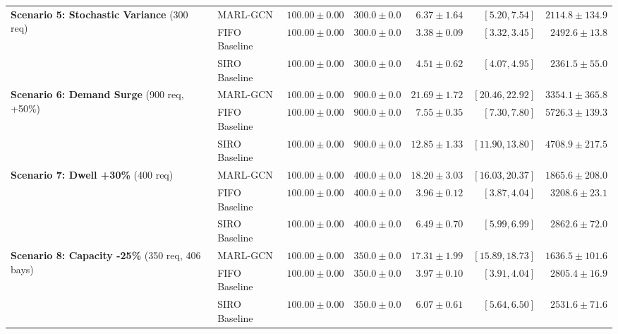 \documentclass[journal]{IEEEtran}
\begin{document}
\begin{table}[t]
\begin{tabular}{llrrrrr}
\midrule
\multirow{3}{*}{\textbf{Scenario 5: Stochastic Variance} (300 req)} 
& MARL-GCN & $100.00 \pm 0.00$ & $300.0 \pm 0.0$ & $6.37 \pm 1.64$ & $[5.20, 7.54]$ & $2114.8 \pm 134.9$ \\
& FIFO Baseline & $100.00 \pm 0.00$ & $300.0 \pm 0.0$ & $3.38 \pm 0.09$ & $[3.32, 3.45]$ & $2492.6 \pm 13.8$ \\
& SIRO Baseline & $100.00 \pm 0.00$ & $300.0 \pm 0.0$ & $4.51 \pm 0.62$ & $[4.07, 4.95]$ & $2361.5 \pm 55.0$ \\
\midrule
\multirow{3}{*}{\textbf{Scenario 6: Demand Surge} (900 req, +50\%)} 
& MARL-GCN & $100.00 \pm 0.00$ & $900.0 \pm 0.0$ & $21.69 \pm 1.72$ & $[20.46, 22.92]$ & $3354.1 \pm 365.8$ \\
& FIFO Baseline & $100.00 \pm 0.00$ & $900.0 \pm 0.0$ & $7.55 \pm 0.35$ & $[7.30, 7.80]$ & $5726.3 \pm 139.3$ \\
& SIRO Baseline & $100.00 \pm 0.00$ & $900.0 \pm 0.0$ & $12.85 \pm 1.33$ & $[11.90, 13.80]$ & $4708.9 \pm 217.5$ \\
\midrule
\multirow{3}{*}{\textbf{Scenario 7: Dwell +30\%} (400 req)} 
& MARL-GCN & $100.00 \pm 0.00$ & $400.0 \pm 0.0$ & $18.20 \pm 3.03$ & $[16.03, 20.37]$ & $1865.6 \pm 208.0$ \\
& FIFO Baseline & $100.00 \pm 0.00$ & $400.0 \pm 0.0$ & $3.96 \pm 0.12$ & $[3.87, 4.04]$ & $3208.6 \pm 23.1$ \\
& SIRO Baseline & $100.00 \pm 0.00$ & $400.0 \pm 0.0$ & $6.49 \pm 0.70$ & $[5.99, 6.99]$ & $2862.6 \pm 72.0$ \\
\midrule
\multirow{3}{*}{\textbf{Scenario 8: Capacity -25\%} (350 req, 406 bays)} 
& MARL-GCN & $100.00 \pm 0.00$ & $350.0 \pm 0.0$ & $17.31 \pm 1.99$ & $[15.89, 18.73]$ & $1636.5 \pm 101.6$ \\
& FIFO Baseline & $100.00 \pm 0.00$ & $350.0 \pm 0.0$ & $3.97 \pm 0.10$ & $[3.91, 4.04]$ & $2805.4 \pm 16.9$ \\
& SIRO Baseline & $100.00 \pm 0.00$ & $350.0 \pm 0.0$ & $6.07 \pm 0.61$ & $[5.64, 6.50]$ & $2531.6 \pm 71.6$ \\
\bottomrule
\end{tabular}
\end{table}
\end{document}
